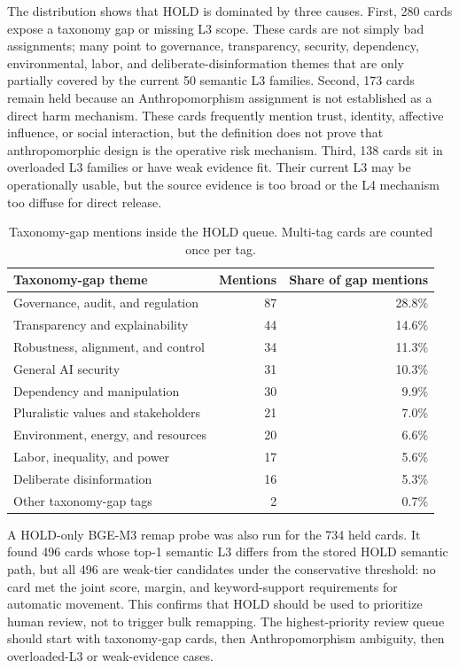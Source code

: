 \documentclass[11pt,a4paper]{article}
\begin{document}
The distribution shows that HOLD is dominated by three causes. First, 280
cards expose a taxonomy gap or missing L3 scope. These cards are not simply
bad assignments; many point to governance, transparency, security,
dependency, environmental, labor, and deliberate-disinformation themes that
are only partially covered by the current 50 semantic L3 families. Second, 173
cards remain held because an Anthropomorphism assignment is not established as
a direct harm mechanism. These cards frequently mention trust, identity,
affective influence, or social interaction, but the definition does not prove
that anthropomorphic design is the operative risk mechanism. Third, 138 cards
sit in overloaded L3 families or have weak evidence fit. Their current L3 may
be operationally usable, but the source evidence is too broad or the L4
mechanism too diffuse for direct release.

\begin{table}[ht]
\centering
\caption{Taxonomy-gap mentions inside the HOLD queue. Multi-tag cards are
counted once per tag.}
\label{tab:hold-taxonomy-gap-v217}
\begin{tabular}{lrr}
\toprule
Taxonomy-gap theme & Mentions & Share of gap mentions \\
\midrule
Governance, audit, and regulation & 87 & 28.8\% \\
Transparency and explainability & 44 & 14.6\% \\
Robustness, alignment, and control & 34 & 11.3\% \\
General AI security & 31 & 10.3\% \\
Dependency and manipulation & 30 & 9.9\% \\
Pluralistic values and stakeholders & 21 & 7.0\% \\
Environment, energy, and resources & 20 & 6.6\% \\
Labor, inequality, and power & 17 & 5.6\% \\
Deliberate disinformation & 16 & 5.3\% \\
Other taxonomy-gap tags & 2 & 0.7\% \\
\bottomrule
\end{tabular}
\end{table}

A HOLD-only BGE-M3 remap probe was also run for the 734 held cards. It found
496 cards whose top-1 semantic L3 differs from the stored HOLD semantic path,
but all 496 are weak-tier candidates under the conservative threshold: no card
met the joint score, margin, and keyword-support requirements for automatic
movement. This confirms that HOLD should be used to prioritize human review,
not to trigger bulk remapping. The highest-priority review queue should start
with taxonomy-gap cards, then Anthropomorphism ambiguity, then overloaded-L3
or weak-evidence cases.
\end{document}
